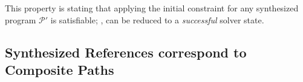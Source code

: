This property is stating that applying the initial constraint for any synthesized program $\mathcal{P}'$ is satisfiable;
\ie, can be reduced to a \emph{successful} solver state.






\subsection{Synthesized References correspond to Composite Paths}%
\label{subsec:composite-paths}

